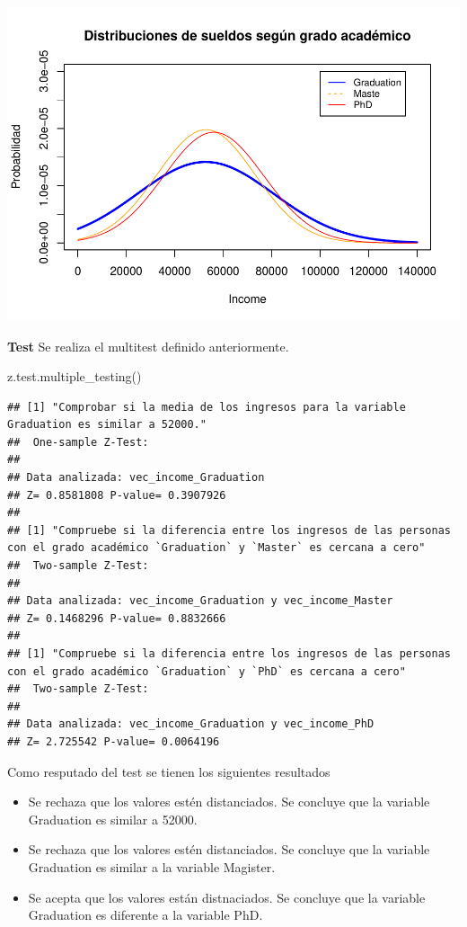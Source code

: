 \documentclass[]{article}
\newenvironment{Shaded}{\begin{snugshade}}{\end{snugshade}}
\newcommand{\FunctionTok}[1]{\textcolor[rgb]{0.00,0.00,0.00}{#1}}
\newcommand{\NormalTok}[1]{#1}
\providecommand{\tightlist}{%
  \setlength{\itemsep}{0pt}\setlength{\parskip}{0pt}}
\begin{document}
\includegraphics{Enunciado_Tarea_3_files/figure-latex/unnamed-chunk-8-1.pdf}

\textbf{Test} Se realiza el multitest definido anteriormente.

\begin{Shaded}
\begin{Highlighting}[]
\FunctionTok{z.test.multiple\_testing}\NormalTok{()}
\end{Highlighting}
\end{Shaded}

\begin{verbatim}
## [1] "Comprobar si la media de los ingresos para la variable Graduation es similar a 52000."
##  One-sample Z-Test:
## 
## Data analizada: vec_income_Graduation 
## Z= 0.8581808 P-value= 0.3907926 
## 
## [1] "Compruebe si la diferencia entre los ingresos de las personas con el grado académico `Graduation` y `Master` es cercana a cero"
##  Two-sample Z-Test:
## 
## Data analizada: vec_income_Graduation y vec_income_Master 
## Z= 0.1468296 P-value= 0.8832666 
## 
## [1] "Compruebe si la diferencia entre los ingresos de las personas con el grado académico `Graduation` y `PhD` es cercana a cero"
##  Two-sample Z-Test:
## 
## Data analizada: vec_income_Graduation y vec_income_PhD 
## Z= 2.725542 P-value= 0.0064196
\end{verbatim}

Como resputado del test se tienen los siguientes resultados

\begin{itemize}
\tightlist
\item
  Se rechaza que los valores estén distanciados. Se concluye que la
  variable Graduation es similar a 52000.
\item
  Se rechaza que los valores estén distanciados. Se concluye que la
  variable Graduation es similar a la variable Magister.
\item
  Se acepta que los valores están distnaciados. Se concluye que la
  variable Graduation es diferente a la variable PhD.
\end{itemize}
\end{document}
